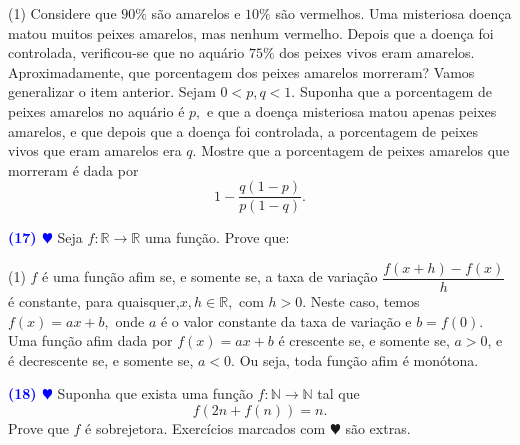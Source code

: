 \documentclass[12pt, a4paper]{article}
\newcommand{\negrito}[1]{\mbox{\boldmath{$#1$}}}
\begin{document}
\begin{tasks}[counter-format={(tsk[a])},label-width=3.6ex, label-format = {\bfseries}, column-sep = {0pt}](1)
\task[\textcolor{Floresta}{$\negrito{(a)} $}] Considere que $90\%$ são amarelos e $10\%$ são vermelhos. Uma misteriosa doença matou muitos peixes amarelos, mas nenhum vermelho. Depois que a doença foi controlada, verificou-se que no aquário $75\%$ dos peixes vivos eram amarelos. Aproximadamente, que porcentagem dos peixes amarelos morreram?
\task[\textcolor{Floresta}{$\negrito{(b)} $}] Vamos generalizar o item anterior. Sejam $0 < p,q < 1.$ Suponha que a porcentagem de peixes amarelos no aquário é $p,$ e que a doença misteriosa matou apenas peixes amarelos, e que depois que a doença foi controlada, a porcentagem de peixes vivos que eram amarelos era $q.$ Mostre que a porcentagem de peixes amarelos que morreram é dada por
\[
1 - \dfrac{q(1-p)}{p(1-q)}.
\]
\end{tasks}
\textcolor{blue}{\bf(17) $\varheart$} Seja $f: \mathbb{R} \rightarrow \mathbb{R}$ uma função. Prove que:
\begin{tasks}[counter-format={(tsk[a])},label-width=3.6ex, label-format = {\bfseries}, column-sep = {0pt}](1)
\task[\textcolor{Floresta}{$\negrito{(a)} $}] $f$ é uma função afim se, e somente se, a taxa de variação $\dfrac{f(x + h) - f(x)}{h}$ é constante, para quaisquer,$x, h \in \mathbb{R},$ com $h > 0.$ Neste caso, temos $f(x) = ax + b,$ onde $a$ é o valor constante da taxa de variação e $b = f(0).$
\task[\textcolor{Floresta}{$\negrito{(b)} $}] Uma função afim dada por $f(x) = ax + b$ é crescente se, e somente se, $a > 0$, e é decrescente se, e somente se, $a < 0.$ Ou seja, toda função afim é monótona.
\end{tasks}
\textcolor{blue}{\bf(18) $\varheart$} Suponha que exista uma função $f \colon \mathbb{N} \to \mathbb{N}$ tal que 
\[
f(2n + f(n)) = n.
\]
Prove que $f$ é sobrejetora.
Exercícios marcados com $\varheart$ são extras.
\end{document}
